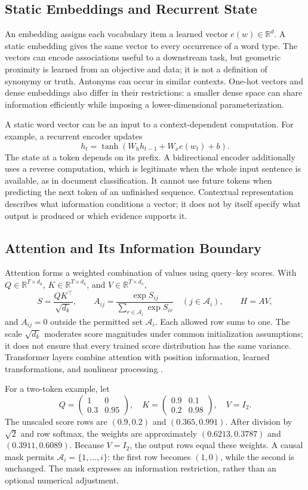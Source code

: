 \subsection{Static Embeddings and Recurrent State}

An embedding assigns each vocabulary item a learned vector $e(w)\in\mathbb R^d$. A static embedding gives the same vector to every occurrence of a word type. The vectors can encode associations useful to a downstream task, but geometric proximity is learned from an objective and data; it is not a definition of synonymy or truth. Antonyms can occur in similar contexts. One-hot vectors and dense embeddings also differ in their restrictions: a smaller dense space can share information efficiently while imposing a lower-dimensional parameterization.

A static word vector can be an input to a context-dependent computation. For example, a recurrent encoder updates
\[
 h_t=\tanh(W_hh_{t-1}+W_xe(w_t)+b).
\]
The state at a token depends on its prefix. A bidirectional encoder additionally uses a reverse computation, which is legitimate when the whole input sentence is available, as in document classification. It cannot use future tokens when predicting the next token of an unfinished sequence. Contextual representation describes what information conditions a vector; it does not by itself specify what output is produced or which evidence supports it.

\subsection{Attention and Its Information Boundary}

Attention forms a weighted combination of values using query--key scores. With $Q\in\mathbb R^{T\times d_k}$, $K\in\mathbb R^{T\times d_k}$, and $V\in\mathbb R^{T\times d_v}$,
\[
 S=\frac{QK^\top}{\sqrt{d_k}},\qquad
 A_{ij}=\frac{\exp S_{ij}}{\sum_{r\in\mathcal A_i}\exp S_{ir}}
 \quad(j\in\mathcal A_i),\qquad H=AV,
\]
and $A_{ij}=0$ outside the permitted set $\mathcal A_i$. Each allowed row sums to one. The scale $\sqrt{d_k}$ moderates score magnitudes under common initialization assumptions; it does not ensure that every trained score distribution has the same variance. Transformer layers combine attention with position information, learned transformations, and nonlinear processing \citep{vaswani2017,devlin2019}.

For a two-token example, let
\[
 Q=\begin{pmatrix}1&0\\0.3&0.95\end{pmatrix},\quad
 K=\begin{pmatrix}0.9&0.1\\0.2&0.98\end{pmatrix},\quad V=I_2.
\]
The unscaled score rows are $(0.9,0.2)$ and $(0.365,0.991)$. After division by $\sqrt2$ and row softmax, the weights are approximately $(0.6213,0.3787)$ and $(0.3911,0.6089)$. Because $V=I_2$, the output rows equal these weights. A causal mask permits $\mathcal A_i=\{1,\ldots,i\}$: the first row becomes $(1,0)$, while the second is unchanged. The mask expresses an information restriction, rather than an optional numerical adjustment.

